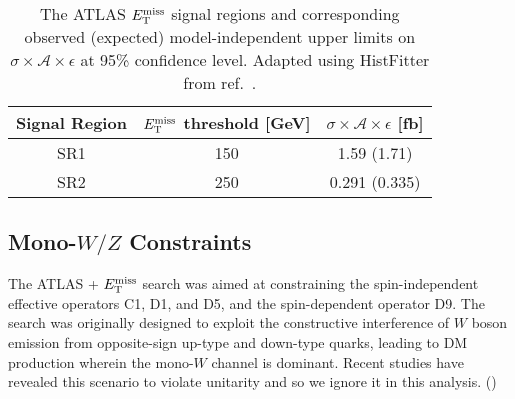 \begin{table}[!htbp]
  \begin{center}
    \begin{tabular}{c|c|c}
      \hline
      \hline
      Signal Region & $E_{\mathrm{T}}^{\mathrm{miss}}$ threshold [GeV] & $\sigma \times \mathcal{A} \times \epsilon$ [fb] \\
      \hline
      SR1 & 150 & 1.59 (1.71) \\
      SR2 & 250 & 0.291 (0.335) \\
      \hline
      \hline
    \end{tabular}
  \end{center}
  \caption{The ATLAS \monoZ $E_{\mathrm{T}}^{\mathrm{miss}}$ signal regions and corresponding observed (expected) model-independent upper limits on $\sigma \times \mathcal{A} \times \epsilon$ at 95\% confidence level. Adapted using HistFitter from ref.~\cite{Aad:2014monoZlep}.}
  \label{tab:sigmalim_monoZ}
\end{table}

\subsection{Mono-$W/Z$ Constraints}
\label{monoWZ_constraints}

The ATLAS \monoWZ + $E_{\mathrm{T}}^{\mathrm{miss}}$ search \cite{Aad:2013monoWZ} was aimed at constraining the spin-independent effective operators C1, D1, and D5, and the spin-dependent operator D9. The search was originally designed to exploit the constructive interference of $W$ boson emission from opposite-sign up-type and down-type quarks, leading to DM production wherein the mono-$W$ channel is dominant. Recent studies \cite{} have revealed this scenario to violate unitarity and so we ignore it in this analysis. ()
%

